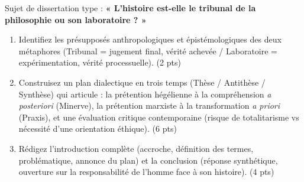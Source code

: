 \documentclass[11pt]{article}
\begin{document}
\begin{exercice}
Sujet de dissertation type : \textbf{« L'histoire est-elle le tribunal de la philosophie ou son laboratoire ? »}
\begin{enumerate}
    \item Identifiez les présupposés anthropologiques et épistémologiques des deux métaphores (Tribunal = jugement final, vérité achevée / Laboratoire = expérimentation, vérité processuelle). (2 pts)
    \item Construisez un plan dialectique en trois temps (Thèse / Antithèse / Synthèse) qui articule : la prétention hégélienne à la compréhension \textit{a posteriori} (Minerve), la prétention marxiste à la transformation \textit{a priori} (Praxis), et une évaluation critique contemporaine (risque de totalitarisme vs nécessité d'une orientation éthique). (6 pts)
    \item Rédigez l'introduction complète (accroche, définition des termes, problématique, annonce du plan) et la conclusion (réponse synthétique, ouverture sur la responsabilité de l'homme face à son histoire). (4 pts)
\end{enumerate}
\end{exercice}
\end{document}
